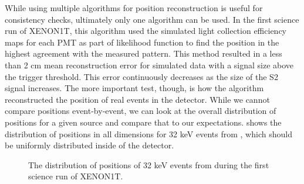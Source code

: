 While using multiple algorithms for position reconstruction is useful for consistency checks, ultimately only one algorithm can be used.  In the first science run of XENON1T, this algorithm used the simulated light collection efficiency maps for each PMT as part of likelihood function to find the position in the highest agreement with the measured pattern.  This method resulted in a less than 2 cm mean reconstruction error for simulated data with a signal size above the trigger threshold.  This error continuously decreases as the size of the S2 signal increases.  The more important test, though, is how the algorithm reconstructed the position of real events in the detector.  While we cannot compare positions event-by-event, we can look at the overall distribution of positions for a given source and compare that to our expectations.   shows the distribution of positions in all dimensions for 32 keV events from , which should be uniformly distributed inside of the detector.


\begin{figure}[t]
	\centering
	 \hfill
	\caption{The distribution of positions of 32 keV events from  during the first science run of XENON1T.}
	\label{fig:xe1t_pos_rec_kr}
\end{figure}


